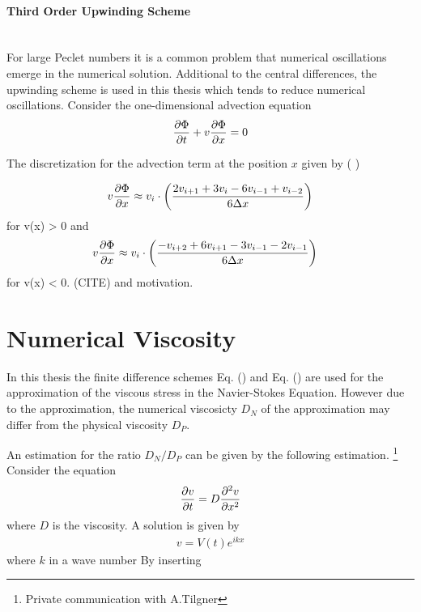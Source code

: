 \paragraph{Third Order Upwinding Scheme}\mbox{}\\

For large Peclet numbers it is a common problem that numerical oscillations emerge in the numerical solution.
Additional to the central differences, the upwinding scheme is used in this thesis which tends to reduce
numerical oscillations. Consider the one-dimensional advection equation
\begin{align}
    \pdn[\Phi]{t} + v\pdn[\Phi]{x} = 0
\end{align}

The discretization for the advection term at the position $x$ given by ( \citep{udtriaend })

\begin{align}
    v\pdn[\Phi]{x} &\approx  v_i \cdot \left(\frac{2v_{i+1} + 3v_i     - 6v_{i-1} + v_{i-2}}{6\Delta x}\right)\\
\end{align}
for v(x) > 0 and
\begin{align}
    v\pdn[\Phi]{x} &\approx  v_i \cdot \left( \frac{-v_{i+2} + 6v_{i+1} - 3v_{i-1} - 2v_{i-1}}{6\Delta x}\right)
\end{align}
for v(x) < 0. (CITE) and motivation.

\newpage

\section{Numerical Viscosity}

In this thesis the finite difference schemes Eq. () and Eq. () are
used for the approximation of the viscous stress in the Navier-Stokes Equation.
However due to the approximation, the numerical viscosicty $D_N$ of the approximation may differ from the physical viscosity $D_P$.

An estimation for the ratio $D_N/D_P$ can be given by the following estimation. \footnote{Private communication with A.Tilgner}
Consider the  equation
\begin{align}
    \pdn[v]{t} = D\pdn[^2v]{x^2}
\end{align}
where $D$ is the viscosity.
A solution is given by
\begin{align}
    v = V(t)e^{ikx}
\end{align}
where $k$ in a wave number
By inserting

